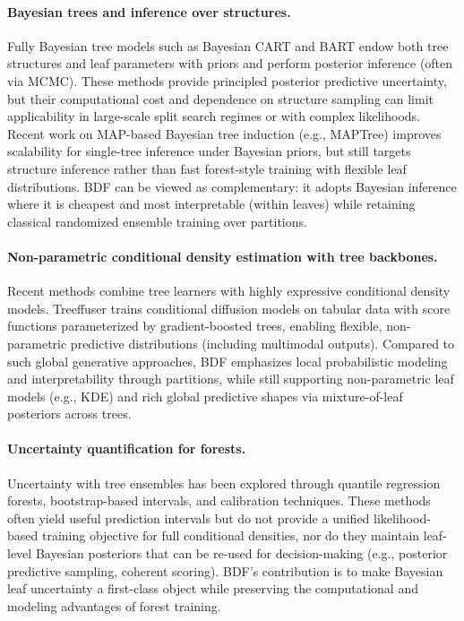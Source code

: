 \documentclass[twoside,11pt]{article}
\begin{document}
\paragraph{Bayesian trees and inference over structures.}
Fully Bayesian tree models such as Bayesian CART and BART \citep{denison1998bayesian,chipman2010bart} endow both tree structures and leaf parameters with priors and perform posterior inference (often via MCMC). These methods provide principled posterior predictive uncertainty, but their computational cost and dependence on structure sampling can limit applicability in large-scale split search regimes or with complex likelihoods.
Recent work on MAP-based Bayesian tree induction (e.g., MAPTree) \citep{sullivan2024maptree} improves scalability for single-tree inference under Bayesian priors, but still targets structure inference rather than fast forest-style training with flexible leaf distributions.
BDF can be viewed as complementary: it adopts Bayesian inference where it is cheapest and most interpretable (within leaves) while retaining classical randomized ensemble training over partitions.

\paragraph{Non-parametric conditional density estimation with tree backbones.}
Recent methods combine tree learners with highly expressive conditional density models. Treeffuser \citep{beltranvelez2024treeffuser} trains conditional diffusion models on tabular data with score functions parameterized by gradient-boosted trees, enabling flexible, non-parametric predictive distributions (including multimodal outputs).
Compared to such global generative approaches, BDF emphasizes local probabilistic modeling and interpretability through partitions, while still supporting non-parametric leaf models (e.g., KDE) and rich global predictive shapes via mixture-of-leaf posteriors across trees.

\paragraph{Uncertainty quantification for forests.}
Uncertainty with tree ensembles has been explored through quantile regression forests, bootstrap-based intervals, and calibration techniques. These methods often yield useful prediction intervals but do not provide a unified likelihood-based training objective for full conditional densities, nor do they maintain leaf-level Bayesian posteriors that can be re-used for decision-making (e.g., posterior predictive sampling, coherent scoring). BDF’s contribution is to make Bayesian leaf uncertainty a first-class object while preserving the computational and modeling advantages of forest training.
\end{document}
